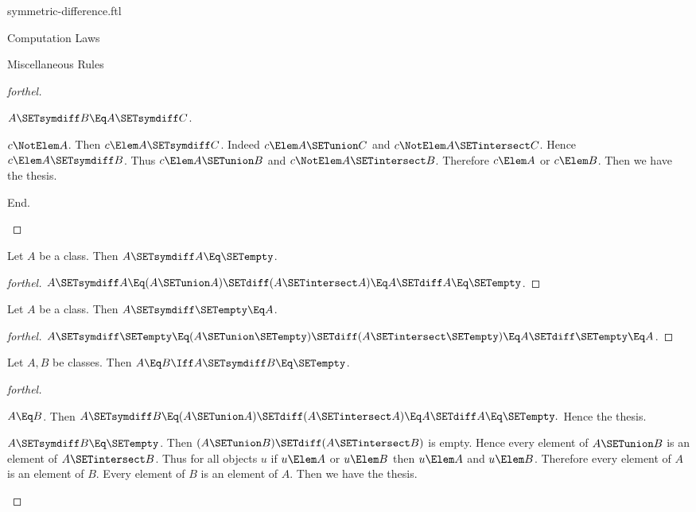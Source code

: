 \documentclass{stex}
\begin{document}
\begin{smodule}{symmetric-difference.ftl}
\begin{sfragment}{Computation Laws}
\begin{sfragment}{Miscellaneous Rules}
\begin{proof}[forthel]
\begin{case}{$A \SETsymdiff B \Eq A \SETsymdiff C$.}
          \begin{case}{$c \NotElem A$.}
            Then $c \Elem A \SETsymdiff C$.
            Indeed $c \Elem A \SETunion C$ and $c \NotElem A \SETintersect C$.
            Hence $c \Elem A \SETsymdiff B$.
            Thus $c \Elem A \SETunion B$ and $c \NotElem A \SETintersect B$.
            Therefore $c \Elem A$ or $c \Elem B$.
            Then we have the thesis.
          \end{case}
        End.
      \end{case}
    \end{proof}

    \begin{proposition}[forthel]
      Let $A$ be a class.
      Then $A \SETsymdiff A \Eq \SETempty$.
    \end{proposition}
    \begin{proof}[forthel]
      $A \SETsymdiff A
        \Eq (A \SETunion A) \SETdiff (A \SETintersect A)
        \Eq A \SETdiff A
        \Eq \SETempty$.
    \end{proof}

    \begin{proposition}[forthel]
      Let $A$ be a class.
      Then $A \SETsymdiff \SETempty \Eq A$.
    \end{proposition}
    \begin{proof}[forthel]
      $A \SETsymdiff \SETempty
        \Eq (A \SETunion \SETempty) \SETdiff (A \SETintersect \SETempty)
        \Eq A \SETdiff \SETempty
        \Eq A$.
    \end{proof}

    \begin{proposition}[forthel]
      Let $A, B$ be classes.
      Then $A \Eq B \Iff A \SETsymdiff B \Eq \SETempty$.
    \end{proposition}
    \begin{proof}[forthel]
      \begin{case}{$A \Eq B$.}
        Then $A \SETsymdiff B
          \Eq (A \SETunion A) \SETdiff (A \SETintersect A)
          \Eq A \SETdiff A
          \Eq \SETempty.$
        Hence the thesis.
      \end{case}

      \begin{case}{$A \SETsymdiff B \Eq \SETempty$.}
        Then $(A \SETunion B) \SETdiff (A \SETintersect B)$ is empty.
        Hence every element of $A \SETunion B$ is an element of $A \SETintersect B$.
        Thus for all objects $u$ if $u \Elem A$ or $u \Elem B$ then $u \Elem A$ and $u \Elem B$.
        Therefore every element of $A$ is an element of $B$.
        Every element of $B$ is an element of $A$.
        Then we have the thesis.
      \end{case}
    \end{proof}
  \end{sfragment}
\end{sfragment}
\end{smodule}
\end{document}
